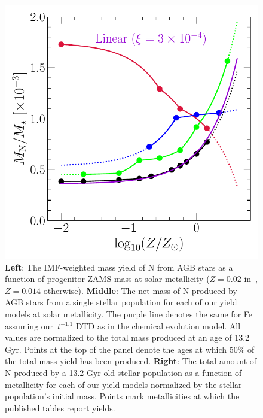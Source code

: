 \documentclass[ms.tex]{subfiles}
\begin{document}
\begin{figure}
\includegraphics[scale = 0.46]{ssp_production_metdep.pdf}
\caption{
\textbf{Left}: The IMF-weighted mass yield of N from AGB stars as a function of
progenitor ZAMS mass at solar metallicity ($Z = 0.02$ in~\karakasten,
$Z = 0.014$ otherwise).
\textbf{Middle}: The net mass of N produced by AGB stars from a single stellar
population for each of our yield models at solar metallicity.
The purple line denotes the same for Fe assuming our~$t^{-1.1}$ DTD as in the
\citet{Johnson2021} chemical evolution model.
All values are normalized to the total mass produced at an age of 13.2 Gyr.
Points at the top of the panel denote the ages at which 50\% of the total mass
yield has been produced.
\textbf{Right}: The total amount of N produced by a 13.2 Gyr old stellar
population as a function of metallicity for each of our yield models normalized
by the stellar population's initial mass.
Points mark metallicities at which the published tables report yields.
}
\label{fig:ssp}
\end{figure}
\end{document}
